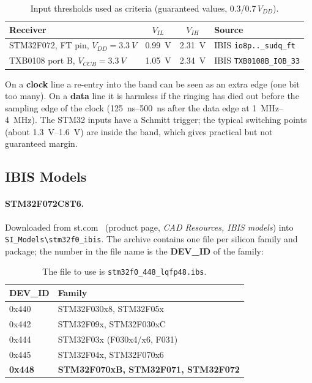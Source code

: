 \documentclass[11pt,a4paper]{article}
\begin{document}
\begin{table}[H]
\centering
\begin{tabular}{lccl}
\toprule
Receiver & $V_{IL}$ & $V_{IH}$ & Source \\
\midrule
STM32F072, FT pin, $V_{DD} = \qty{3.3}{V}$ & \qty{0.99}{V} & \qty{2.31}{V} & IBIS \texttt{io8p..\_sudq\_ft} \\
TXB0108 port B, $V_{CCB} = \qty{3.3}{V}$ & \qty{1.05}{V} & \qty{2.34}{V} & IBIS \texttt{TXB0108B\_IOB\_33} \\
\bottomrule
\end{tabular}
\caption{Input thresholds used as criteria (guaranteed values, 0.3/0.7\,$V_{DD}$).}
\label{tab:thresholds}
\end{table}

On a \textbf{clock} line a re-entry into the band can be seen as an extra edge (one bit too many). On
a \textbf{data} line it is harmless if the ringing has died out before the sampling edge of the clock (\qtyrange{125}{500}{ns}
after the data edge at \qtyrange{1}{4}{MHz}). The STM32 inputs have a Schmitt trigger;
the typical switching points (about \qtyrange{1.3}{1.6}{V}) are inside the band, which gives practical but
not guaranteed margin.

\subsection{IBIS Models}

\paragraph{STM32F072C8T6.} Downloaded from st.com~\cite{stibis} (product page, \textit{CAD Resources, IBIS models})
into \texttt{SI\_Models\textbackslash stm32f0\_ibis}. The archive contains one file per silicon family and package;
the number in the file name is the \textbf{DEV\_ID} of the family:

\begin{table}[H]
\centering
\begin{tabular}{ll}
\toprule
DEV\_ID & Family \\
\midrule
0x440 & STM32F030x8, STM32F05x \\
0x442 & STM32F09x, STM32F030xC \\
0x444 & STM32F03x (F030x4/x6, F031) \\
0x445 & STM32F04x, STM32F070x6 \\
\textbf{0x448} & \textbf{STM32F070xB, STM32F071, STM32F072} \\
\bottomrule
\end{tabular}
\caption{The file to use is \texttt{stm32f0\_448\_lqfp48.ibs}.}
\label{tab:devid}
\end{table}
\end{document}
